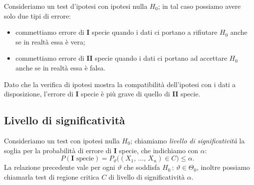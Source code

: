         \begin{defn}
            Consideriamo un test d'ipotesi con ipotesi nulla $H_0$; in tal caso possiamo avere solo due tipi 
            di errore:
            \begin{itemize}
                \item commettiamo errore di $\mathbf{I}$ specie quando i dati ci portano a rifiutare $H_0$ 
                    anche se in realtà essa è vera;
                \item commettiamo errore di $\mathbf{II}$ specie quando i dati ci portano ad accettare $H_0$ 
                    anche se in realtà essa è falsa.
            \end{itemize}
            Dato che la verifica di ipotesi mostra la compatibilità dell'ipotesi con i dati a disposizione, 
            l'errore di $\mathbf{I}$ specie è più grave di quello di $\mathbf{II}$ specie.
        \end{defn}
        \subsection{Livello di significatività}
            \begin{defn}
                Consideriamo un test con ipotesi nulla $H_0$; chiamiamo \emph{livello di significatività} la 
                soglia per la probabilità di errore di $\mathbf{I}$ specie, che indichiamo con $\alpha$: \[
                    P(\mathbf{I}\text{ specie}) 
                    = P_\vartheta\big((X_1,\, \ldots,\, X_{n}) \in C\big) \leq \alpha
                .\] La relazione precedente vale per ogni $\vartheta$ che soddisfa 
                $H_0\,:\, \vartheta \in \Theta_0$, inoltre possiamo chiamarla test di regione critica $C$ 
                di livello di significatività $\alpha$.
            \end{defn}

